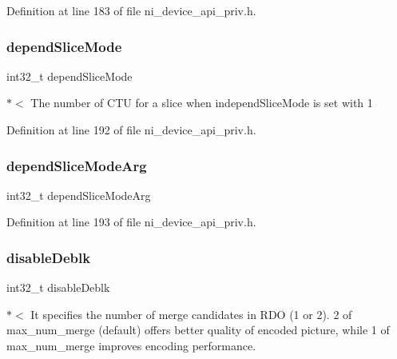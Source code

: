Definition at line 183 of file ni\+\_\+device\+\_\+api\+\_\+priv.\+h.

\mbox{\label{struct__ni__t408__config__t_ab8e0ef7bdea29cbeb8cafb61dab9c65a}} 
\subsubsection{\texorpdfstring{dependSliceMode}{dependSliceMode}}
{\footnotesize\ttfamily int32\+\_\+t depend\+Slice\+Mode}

$\ast$$<$ The number of C\+TU for a slice when independ\+Slice\+Mode is set with 1 

Definition at line 192 of file ni\+\_\+device\+\_\+api\+\_\+priv.\+h.

\mbox{\label{struct__ni__t408__config__t_a418194649eee2e58f35a84e155b9d02f}} 
\subsubsection{\texorpdfstring{dependSliceModeArg}{dependSliceModeArg}}
{\footnotesize\ttfamily int32\+\_\+t depend\+Slice\+Mode\+Arg}



Definition at line 193 of file ni\+\_\+device\+\_\+api\+\_\+priv.\+h.

\mbox{\label{struct__ni__t408__config__t_a7c82aec867ab070248f2e6135071b680}} 
\subsubsection{\texorpdfstring{disableDeblk}{disableDeblk}}
{\footnotesize\ttfamily int32\+\_\+t disable\+Deblk}

$\ast$$<$ It specifies the number of merge candidates in R\+DO (1 or 2). 2 of max\+\_\+num\+\_\+merge (default) offers better quality of encoded picture, while 1 of max\+\_\+num\+\_\+merge improves encoding performance. 

